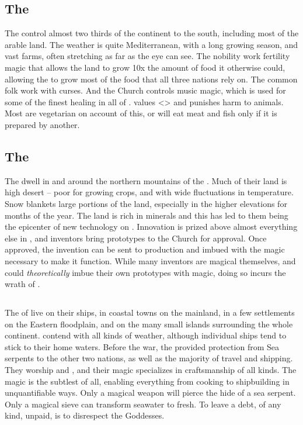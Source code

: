 \documentclass[blue]{GL2020}
\begin{document}
\subsection*{The \pFarm{}}
The \pFarm{} control almost two thirds of the continent to the south, including most of the arable land. The weather is quite Mediterranean, with a long growing season, and vast farms, often stretching as far as the eye can see. The nobility work fertility magic that allows the land to grow 10x the amount of food it otherwise could, allowing the \pFarmers{} to grow most of the food that all three nations rely on. The common folk work with curses. And the Church controls music magic, which is used for some of the finest healing in all of \pEarth{}. \cFarmGod{} values <> and punishes harm to animals. Most \pFarmers{} are vegetarian on account of this, or will eat meat and fish only if it is prepared by another.

\subsection*{The \pTech{}}
The \pTech{} dwell in and around the northern mountains of the \pSpine{}. Much of their land is high desert -- poor for growing crops, and with wide fluctuations in temperature. Snow blankets large portions of the land, especially in the higher elevations for months of the year. The \pTech{} land is rich in minerals and this has led to them being the epicenter of new technology on \pEarth{}. Innovation is prized above almost everything else in \pTech{}, and inventors bring prototypes to the Church for approval. Once approved, the invention can be sent to production and imbued with the magic necessary to make it function. While many inventors are magical themselves, and could \emph{theoretically} imbue their own prototypes with magic, doing so incurs the wrath of \cTechGod{}.

\subsection*{\pShip{}}
The \pShippies{} of \pShip{} live on their ships, in coastal towns on the mainland, in a few settlements on the Eastern floodplain, and on the many small islands surrounding the whole continent. \pShippies{} contend with all kinds of weather, although individual ships tend to stick to their home waters. Before the war, the \pShippies{} provided protection from Sea serpents to the other two nations, as well as the majority of travel and shipping. They worship \cEbb{\full} and \cFlow{\full}, and their magic specializes in craftsmanship of all kinds. The \pShip{} magic is the subtlest of all, enabling everything from cooking to shipbuilding in unquantifiable ways. Only a magical weapon will pierce the hide of a sea serpent. Only a magical sieve can transform seawater to fresh. To leave a debt, of any kind, unpaid, is to disrespect the Goddesses.
\end{document}
